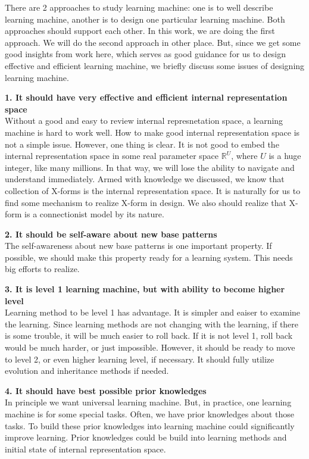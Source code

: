 There are 2 approaches to study learning machine: one is to well describe learning machine, another is to design one particular learning machine. Both approaches should support each other. In this work, we are doing the first approach. We will do the second approach in other place. But, since we get some good insights from work here, which serves as good guidance for us to design effective and efficient learning machine, we briefly discuss some issues of designing learning machine. 


{\bf 1. It should have very effective and efficient internal representation space} \\
Without a good and easy to review internal represnetation space, a learning machine is hard to work well. How to make good internal representation space is not a simple issue. However, one thing is clear. It is not good to embed the internal representation space in some real parameter space $\mathbb{ R}^U$, where $U$ is a huge integer, like many millions. In that way, we will lose the ability to navigate and understand immediately. Armed with knowledge we discussed, we know that collection of X-forms is the internal representation space. It is naturally for us to find some mechanism to realize X-form in design. We also should realize that X-form is a connectionist model by its nature.

{\bf 2. It should be self-aware about new base patterns} \\
The self-awareness about new base patterns is one important property. If possible, we should make this property ready for a learning system. This needs big efforts to realize. 

{\bf 3. It is level 1 learning machine, but with ability to become higher level} \\
Learning method to be level 1 has advantage. It is simpler and eaiser to examine the learning. Since learning methods are not changing with the learning, if there is some trouble, it will be much easier to roll back. If it is not level 1, roll back would be much harder, or just impossible. However, it should be ready to move to level 2, or even higher learning level, if necessary. It should fully utilize evolution and inheritance methods if needed.

{\bf 4. It should have best possible prior knowledges} \\
In principle we want universal learning machine. But, in practice, one learning machine is for some special tasks. Often, we have prior knowledges about those tasks. To build these prior knowledges into learning machine could significantly improve learning. Prior knowledges could be build into learning methods and initial state of internal representation space. 


